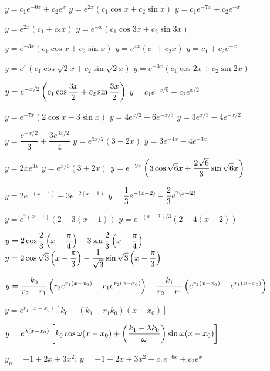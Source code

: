 
 $y=c_1e^{-6x}+c_2e^{x}$
  $y=e^{2x}(c_1 \cos x+c_2 \sin x)$
 $y=c_1e^{-7x}+c_2e^{-x}$

 $y=e^{2x}(c_1+c_2x)$
  $y=e^{-x}(c_1 \cos 3x+c_2 \sin 3x)$

  $y=e^{-3x}(c_1 \cos x+c_2 \sin x)$
 $y=e^{4x}(c_1+c_2x)$
 $y=c_1+c_2e^{-x}$

  $y=e^x(c_1 \cos \sqrt{2}x+c_2 \sin \sqrt{2} x)$
 $y=e^{-3x}(c_1\cos 2x+c_2\sin 2x)$

 $\displaystyle{y=e^{-x/2}\left(c_1\cos \frac{3x}{2}+c_2\sin
\frac{3x}{2}\right)}$
 $y=c_1e^{-x/5}+c_2e^{x/2}$

  $y=e^{-7x}(2 \cos x - 3 \sin x)$
  $y=4e^{x/2}+6e^{-x/3}$
  $y=3e^{x/3}-4e^{-x/2}$

 $y=\dfrac{e^{-x/2}}{3}+\dfrac{3e^{3x/2}}{4}$
  $y=e^{3x/2} (3-2x)$
  $y=3e^{-4x}-4e^{-3x}$

  $y=2xe^{3x}$
  $y=e^{x/6}(3+2x)$
 $\displaystyle{y=e^{-2x}\left(3 \cos \sqrt{6} x+\frac{2 \sqrt{6}}{3}
\sin \sqrt{6} x\right)}$

 $y=2e^{-(x-1)}-3e^{-2(x-1)}$
 $y=\displaystyle{\frac{1}{3}e^{-(x-2)}-\frac{2}{3}e^{7(x-2)}}$

 $y=e^{7(x-1)}\left(2-3(x-1)\right)$
 $y=e^{-(x-2)/3}\left(2-4(x-2)\right)$

 $y=\displaystyle{2\cos
\frac{2}{3}\left(x-\frac{\pi}{4}\right)-3\sin
\frac{2}{3}\left(x-\frac{\pi}{4}\right)}$
$y=\displaystyle{2\cos \sqrt3\left(x-\frac{\pi}{3}\right)-\frac{1}{\sqrt3}\sin
\sqrt3\left(x-\frac{\pi}{3}\right)}$

$y=\displaystyle{\frac{k_0}{r_2-r_1}\left(r_2e^{r_1(x-x_0)}-r_1e^{r_2(x-x_0)}\right)+\frac{k_1}{r_2-r_1} \left(e^{r_2(x-x_0)}-e^{r_1(x-x_0)}\right)}$

$y=e^{r_1(x-x_0)}\left[k_0+(k_1-r_1k_0)(x-x_0)\right]$

$y=\displaystyle{e^{\lambda(x-x_0)}\left[k_0\cos\omega(x-x_0)+\left(\frac{k_1-\lambda
k_0}{\omega}\right)\sin\omega(x-x_0)\right]}$



 $y_p=-1+2x+3x^2$;    $y=-1+2x+3x^2+c_1e^{-6x}+c_2e^{x}$

